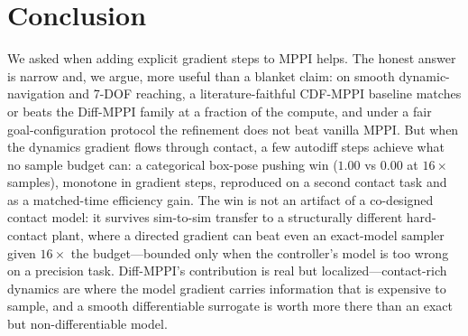 \documentclass[journal]{IEEEtran}
\begin{document}
\section{Conclusion}
\label{sec:conclusion}

We asked when adding explicit gradient steps to MPPI helps. The honest answer is
narrow and, we argue, more useful than a blanket claim: on smooth
dynamic-navigation and 7-DOF reaching, a literature-faithful CDF-MPPI baseline
matches or beats the Diff-MPPI family at a fraction of the compute, and under a
fair goal-configuration protocol the refinement does not beat vanilla MPPI. But
when the dynamics gradient flows through contact, a few autodiff steps achieve
what no sample budget can: a categorical box-pose pushing win ($1.00$ vs $0.00$
at $16\times$ samples), monotone in gradient steps, reproduced on a second
contact task and as a matched-time efficiency gain. The win is not an artifact of a
co-designed contact model: it survives sim-to-sim transfer to a structurally
different hard-contact plant, where a directed gradient can beat even an exact-model
sampler given $16\times$ the budget---bounded only when the controller's model is too
wrong on a precision task. Diff-MPPI's contribution is real but localized---contact-rich
dynamics are where the model gradient carries information that is expensive to sample,
and a smooth differentiable surrogate is worth more there than an exact but
non-differentiable model.



\end{document}
